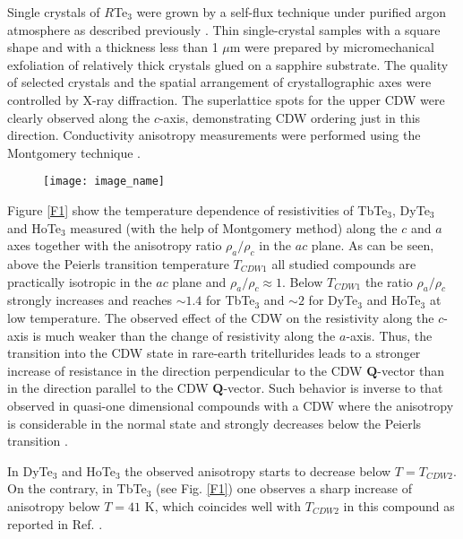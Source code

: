 Single crystals of $R$Te$_{3}$ were grown by a self-flux technique
under purified argon atmosphere as described previously
\cite{SinchPRB12}. Thin single-crystal samples with a square shape
and with a thickness less than 1 $\mu $m were prepared by
micromechanical exfoliation of relatively thick crystals glued on a
sapphire substrate. The quality of selected crystals and the spatial
arrangement of crystallographic axes were controlled by X-ray
diffraction. The superlattice spots for the upper CDW were clearly
observed along the $c$-axis, demonstrating CDW ordering just in this
direction. Conductivity anisotropy measurements were performed using
the Montgomery technique \cite{Montgomery71,Logan71}.

\begin{figure}[h]
\texttt{[image: image\_name]}
\label{fig:label}
\end{figure}


Figure \ref{F1} show the temperature dependence of resistivities
of TbTe$_{3}$, DyTe$_{3}$ and HoTe$_{3}$ measured (with the help
of Montgomery method) along the $c$ and $a$ axes together with the
anisotropy ratio $\rho _{a}/\rho _{c}$ in the $ac$ plane. As can
be seen, above the Peierls transition temperature $T_{CDW1}$ all
studied compounds are practically isotropic in the $ac$ plane and
$\rho _{a}/\rho _{c}\approx 1$. Below $T_{CDW1}$ the ratio
$\rho_{a}/\rho _{c}$ strongly increases and reaches $\sim 1.4$ for
TbTe$_{3}$ and $\sim 2$ for DyTe$_{3}$ and HoTe$_{3}$ at low
temperature. The observed effect of the CDW on the resistivity
along the $c$-axis is much weaker than the change of resistivity
along the $a$-axis. Thus, the transition into the CDW state in
rare-earth tritellurides leads to a stronger increase of
resistance in the direction perpendicular to the CDW
$\mathbf{Q}$-vector than in the direction parallel to the CDW
$\mathbf{Q}$-vector. Such behavior is inverse to that observed in
quasi-one dimensional compounds with a CDW where the anisotropy is
considerable in the normal state and strongly decreases below the
Peierls transition \cite{OngBrill78}.

In DyTe$_{3}$ and HoTe$_{3}$ the observed anisotropy starts to
decrease below $T=T_{CDW2}$. On the contrary, in TbTe$_{3}$ (see
Fig. \ref{F1}) one observes a sharp increase of anisotropy below
$T=41$ K, which coincides well with $T_{CDW2}$ in this compound as
reported in Ref. \cite{BB}.

